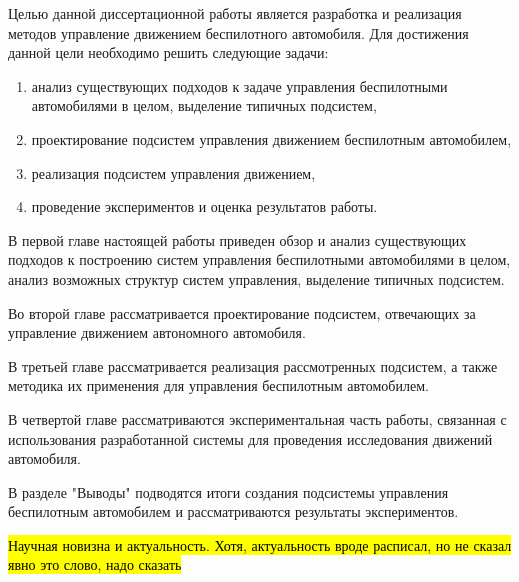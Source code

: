 Целью данной диссертационной работы является разработка и реализация методов управление движением беспилотного
автомобиля. Для достижения данной цели необходимо решить следующие задачи:

\begin{enumerate}
    \item анализ существующих подходов к задаче управления беспилотными автомобилями в целом, выделение 
          типичных подсистем,
    \item проектирование подсистем управления движением беспилотным автомобилем,
    \item реализация подсистем управления движением,
    \item проведение экспериментов и оценка результатов работы. 
\end{enumerate}

В первой главе настоящей работы приведен обзор и анализ существующих подходов к построению систем управления
беспилотными автомобилями в целом, анализ возможных структур систем управления, выделение типичных подсистем.

Во второй главе рассматривается проектирование подсистем, отвечающих за управление движением автономного
автомобиля. 

В третьей главе рассматривается реализация рассмотренных подсистем, а также методика их применения для управления
беспилотным автомобилем.  

В четвертой главе рассматриваются экспериментальная часть работы, связанная с использования разработанной системы
для проведения исследования движений автомобиля. 

В разделе "Выводы" подводятся итоги создания подсистемы управления беспилотным автомобилем и рассматриваются
результаты экспериментов.

\hl{Научная новизна и актуальность. Хотя, актуальность вроде расписал, но не сказал явно это слово, надо сказать}

